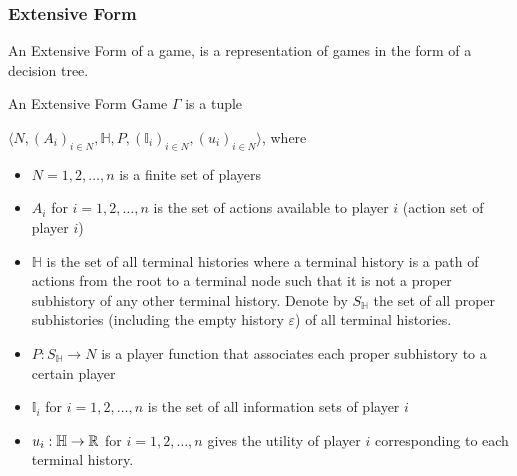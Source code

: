 \subsubsection{Extensive Form}
An Extensive Form of a game, is a representation of games in the form of a decision tree.
\begin{defn}{\label{def:efg}}
    An Extensive Form Game $\Gamma$ is a tuple 

    $\langle N,(A_i)_{i\in N},\mathbb{H},P,(\mathbb{I}_i)_{i\in N},(u_i)_{i\in N}\rangle$, where
    \begin{itemize}
        \item $N = {1, 2,\ldots,n}$ is a finite set of players
        \item $A_i$ for $i=1, 2,\ldots,n$ is the set of actions available to player $i$ (action set of player $i$)
        \item $\mathbb{H}$ is the set of all terminal histories where a terminal history is a path of actions from the root to a terminal node such that it is not a proper subhistory of any other terminal history. Denote by $S_\mathbb{H}$ the set of all proper subhistories (including the empty history $\varepsilon$) of all terminal histories.
        \item $P : S_\mathbb{H} \rightarrow N$ is a player function that associates each proper subhistory to a certain player
        \item $\mathbb{I}_i$ for $i = 1, 2,\ldots,n$ is the set of all information sets of player $i$
        \item $u_i : \mathbb{H} \rightarrow \mathbb{R}$ for $i = 1, 2,\ldots,n$ gives the utility of player $i$ corresponding to each terminal history.
    \end{itemize}
\end{defn}
